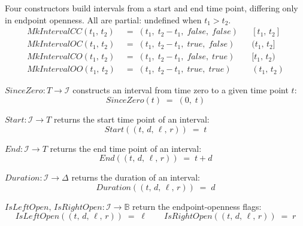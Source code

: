 \begin{definition}\label{def:mk_interval}
    Four constructors build intervals from a start and end time point, differing only in endpoint openness.
    All are partial: undefined when $t_1 > t_2$.
    \begin{align*}
        \mathit{MkIntervalCC}(t_1,\, t_2) & \;=\; (t_1,\; t_2 - t_1,\; \mathit{false},\; \mathit{false}) &  & [t_1,\, t_2] \\
        \mathit{MkIntervalOC}(t_1,\, t_2) & \;=\; (t_1,\; t_2 - t_1,\; \mathit{true},\;  \mathit{false}) &  & (t_1,\, t_2] \\
        \mathit{MkIntervalCO}(t_1,\, t_2) & \;=\; (t_1,\; t_2 - t_1,\; \mathit{false},\; \mathit{true})  &  & [t_1,\, t_2) \\
        \mathit{MkIntervalOO}(t_1,\, t_2) & \;=\; (t_1,\; t_2 - t_1,\; \mathit{true},\;  \mathit{true})  &  & (t_1,\, t_2)
    \end{align*}
\end{definition}

\begin{definition}\label{def:since_zero}
    $\mathit{SinceZero} : T \rightarrow \mathcal{I}$ constructs an interval from time zero to a given time point $t$:
    \[
        \mathit{SinceZero}(t) \;=\; (0,\; t)
    \]
\end{definition}

\begin{definition}\label{def:interval_start}
    $\mathit{Start} : \mathcal{I} \rightarrow T$ returns the start time point of an interval:
    \[
        \mathit{Start}((t,\, d,\, \ell,\, r)) \;=\; t
    \]
\end{definition}

\begin{definition}\label{def:interval_end}
    $\mathit{End} : \mathcal{I} \rightarrow T$ returns the end time point of an interval:
    \[
        \mathit{End}((t,\, d,\, \ell,\, r)) \;=\; t + d
    \]
\end{definition}

\begin{definition}\label{def:interval_duration}
    $\mathit{Duration} : \mathcal{I} \rightarrow \Delta$ returns the duration of an interval:
    \[
        \mathit{Duration}((t,\, d,\, \ell,\, r)) \;=\; d
    \]
\end{definition}

\begin{definition}\label{def:interval_open}
    $\mathit{IsLeftOpen},\, \mathit{IsRightOpen} : \mathcal{I} \rightarrow \mathbb{B}$ return the endpoint-openness flags:
    \[
        \mathit{IsLeftOpen}((t,\, d,\, \ell,\, r)) \;=\; \ell
        \qquad
        \mathit{IsRightOpen}((t,\, d,\, \ell,\, r)) \;=\; r
    \]
\end{definition}

